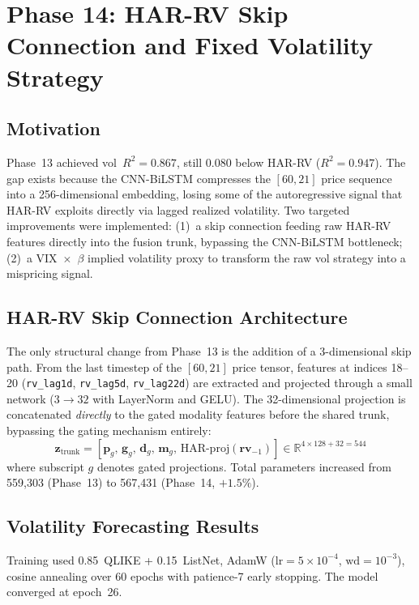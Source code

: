 \documentclass[12pt,a4paper]{article}
\begin{document}
\section{Phase 14: HAR-RV Skip Connection and Fixed Volatility Strategy}

\subsection{Motivation}

Phase~13 achieved vol~$R^2 = 0.867$, still $0.080$ below HAR-RV ($R^2 = 0.947$).
The gap exists because the CNN-BiLSTM compresses the $[60, 21]$ price sequence
into a 256-dimensional embedding, losing some of the autoregressive signal that
HAR-RV exploits directly via lagged realized volatility.  Two targeted
improvements were implemented: (1)~a skip connection feeding raw HAR-RV features
directly into the fusion trunk, bypassing the CNN-BiLSTM bottleneck; (2)~a
VIX~$\times$~$\beta$ implied volatility proxy to transform the raw vol strategy
into a mispricing signal.

\subsection{HAR-RV Skip Connection Architecture}

The only structural change from Phase~13 is the addition of a 3-dimensional skip
path.  From the last timestep of the $[60, 21]$ price tensor, features at
indices 18--20 (\texttt{rv\_lag1d}, \texttt{rv\_lag5d}, \texttt{rv\_lag22d}) are
extracted and projected through a small network ($3 \to 32$ with LayerNorm and
GELU).  The 32-dimensional projection is concatenated \emph{directly} to the
gated modality features before the shared trunk, bypassing the gating mechanism
entirely:
\[
  \mathbf{z}_{\text{trunk}} = [\mathbf{p}_g,\, \mathbf{g}_g,\, \mathbf{d}_g,\,
  \mathbf{m}_g,\, \text{HAR-proj}(\mathbf{rv}_{-1})]
  \in \mathbb{R}^{4 \times 128 + 32 = 544}
\]
where subscript $g$ denotes gated projections.  Total parameters increased from
559,303 (Phase~13) to 567,431 (Phase~14, $+1.5\%$).

\subsection{Volatility Forecasting Results}

Training used 0.85~QLIKE + 0.15~ListNet, AdamW ($\text{lr}=5\times10^{-4}$,
$\text{wd}=10^{-3}$), cosine annealing over 60 epochs with patience-7 early
stopping.  The model converged at epoch~26.
\end{document}
